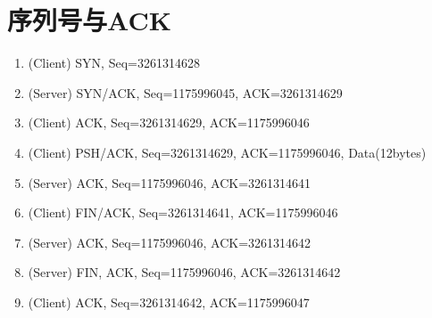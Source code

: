 \documentclass[12pt]{article}
\begin{document}
\begin{Shaded}
\begin{Highlighting}[]
     \OperatorTok{:} 
    \OperatorTok{:} \OperatorTok{(} \OperatorTok{),} \OperatorTok{{-}}\OperatorTok{(}\OperatorTok{),} \OperatorTok{{-}}\OperatorTok{(}\OperatorTok{),} 
          \OperatorTok{{-}} \OperatorTok{{-}}\OperatorTok{(}\OperatorTok{)}
          \OperatorTok{{-}} \OperatorTok{{-}}\OperatorTok{(}\OperatorTok{)}
          \OperatorTok{{-}} \OperatorTok{:}  \OperatorTok{,}  
    \OperatorTok{[}\OperatorTok{/} \OperatorTok{]}
        \OperatorTok{[}        \OperatorTok{:} \OperatorTok{]}
        \OperatorTok{[}      \OperatorTok{:}  \OperatorTok{]}
    \OperatorTok{[}\OperatorTok{]}
\end{Highlighting}
\end{Shaded}

\section{序列号与ACK}\label{ux5e8fux5217ux53f7ux4e0eack}

\begin{enumerate}
\def\labelenumi{\arabic{enumi}.}
\tightlist
\item
  (Client) SYN, Seq=3261314628
\item
  (Server) SYN/ACK, Seq=1175996045, ACK=3261314629
\item
  (Client) ACK, Seq=3261314629, ACK=1175996046
\item
  (Client) PSH/ACK, Seq=3261314629, ACK=1175996046, Data(12bytes)
\item
  (Server) ACK, Seq=1175996046, ACK=3261314641
\item
  (Client) FIN/ACK, Seq=3261314641, ACK=1175996046
\item
  (Server) ACK, Seq=1175996046, ACK=3261314642
\item
  (Server) FIN, ACK, Seq=1175996046, ACK=3261314642
\item
  (Client) ACK, Seq=3261314642, ACK=1175996047
\end{enumerate}
\end{document}
